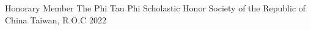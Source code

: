 



\begin{cvhonors}

  \cvhonor
    {Honorary Member} %
    {The Phi Tau Phi Scholastic Honor Society of the Republic of China} %
    {Taiwan, R.O.C} %
    {2022} %


\end{cvhonors}
